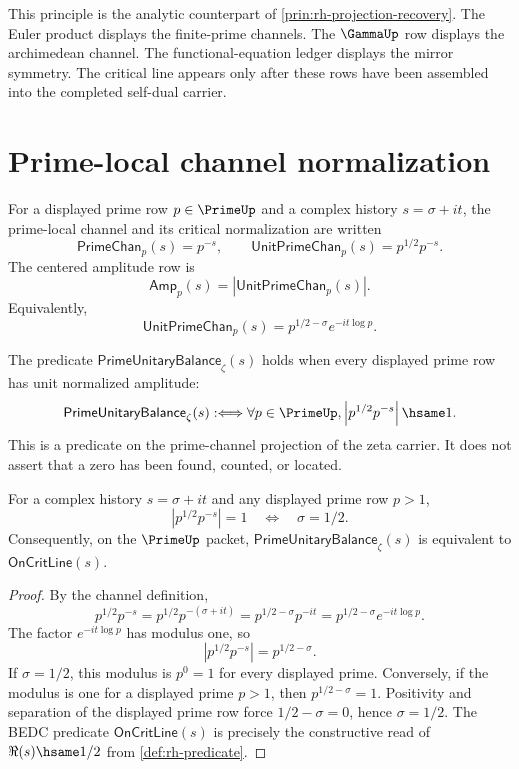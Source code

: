 This principle is the analytic counterpart of
\autoref{prin:rh-projection-recovery}.  The Euler product displays the
finite-prime channels.  The $\GammaUp$ row displays the archimedean channel.
The functional-equation ledger displays the mirror symmetry.  The critical
line appears only after these rows have been assembled into the completed
self-dual carrier.

\section{Prime-local channel normalization}
\label{sec:rh-prime-local-channel-normalization}

\begin{definition}
\label{def:rh-prime-local-channels}
For a displayed prime row $p\in\PrimeUp$ and a complex history
$s=\sigma+it$, the prime-local channel and its critical normalization are
written
$$
\mathsf{PrimeChan}_p(s)=p^{-s},
\qquad
\mathsf{UnitPrimeChan}_p(s)=p^{1/2}p^{-s}.
$$
The centered amplitude row is
$$
\mathsf{Amp}_p(s)=
\left|\mathsf{UnitPrimeChan}_p(s)\right|.
$$
Equivalently,
$$
\mathsf{UnitPrimeChan}_p(s)
=p^{1/2-\sigma}e^{-it\log p}.
$$
\end{definition}

\begin{definition}
\label{def:rh-prime-unitary-balance}
The predicate $\mathsf{PrimeUnitaryBalance}_{\zeta}(s)$ holds when every
displayed prime row has unit normalized amplitude:
$$
\mathsf{PrimeUnitaryBalance}_{\zeta}(s)
:\Longleftrightarrow
\forall p\in\PrimeUp,
\left|p^{1/2}p^{-s}\right|\hsame 1.
$$
This is a predicate on the prime-channel projection of the zeta carrier.  It
does not assert that a zero has been found, counted, or located.
\end{definition}

\begin{theorem}
\label{thm:rh-prime-unitary-balance-critical-line}
For a complex history $s=\sigma+it$ and any displayed prime row $p>1$,
$$
\left|p^{1/2}p^{-s}\right|=1
\quad\Longleftrightarrow\quad
\sigma=1/2.
$$
Consequently, on the $\PrimeUp$ packet, $\mathsf{PrimeUnitaryBalance}_{\zeta}(s)$
is equivalent to $\mathsf{OnCritLine}(s)$.
\end{theorem}

\begin{proof}
By the channel definition,
$$
p^{1/2}p^{-s}
=p^{1/2}p^{-(\sigma+it)}
=p^{1/2-\sigma}p^{-it}
=p^{1/2-\sigma}e^{-it\log p}.
$$
The factor $e^{-it\log p}$ has modulus one, so
$$
\left|p^{1/2}p^{-s}\right|=p^{1/2-\sigma}.
$$
If $\sigma=1/2$, this modulus is $p^0=1$ for every displayed prime.  Conversely,
if the modulus is one for a displayed prime $p>1$, then
$p^{1/2-\sigma}=1$.  Positivity and separation of the displayed prime row force
$1/2-\sigma=0$, hence $\sigma=1/2$.  The BEDC predicate
$\mathsf{OnCritLine}(s)$ is precisely the constructive read of
$\Re(s)\hsame 1/2$ from \autoref{def:rh-predicate}.
\end{proof}


